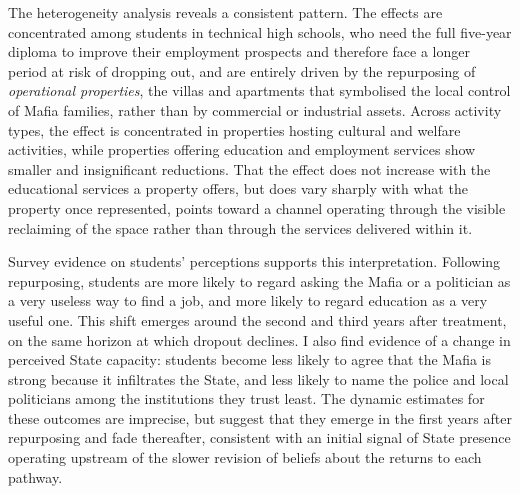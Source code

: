 \documentclass[12pt]{article}
\theoremstyle{plain}
\theoremstyle{plain}
\theoremstyle{plain}
\theoremstyle{definition}
\theoremstyle{plain}
\theoremstyle{definition}
\theoremstyle{plain}
\theoremstyle{remark}
\theoremstyle{definition}
\theoremstyle{definition}
\theoremstyle{plain}
\begin{document}
The heterogeneity analysis reveals a consistent pattern. The effects are concentrated among students in technical high schools, who need the full five-year diploma to improve their employment prospects and therefore face a longer period at risk of dropping out, and are entirely driven by the repurposing of \emph{operational properties}, the villas and apartments that symbolised the local control of Mafia families, rather than by commercial or industrial assets. Across activity types, the effect is concentrated in properties hosting cultural and welfare activities, while properties offering education and employment services show smaller and insignificant reductions. That the effect does not increase with the educational services a property offers, but does vary sharply with what the property once represented, points toward a channel operating through the visible reclaiming of the space rather than through the services delivered within it.

Survey evidence on students' perceptions supports this interpretation. Following repurposing, students are more likely to regard asking the Mafia or a politician as a very useless way to find a job, and more likely to regard education as a very useful one. This shift emerges around the second and third years after treatment, on the same horizon at which dropout declines. I also find evidence of a change in perceived State capacity: students become less likely to agree that the Mafia is strong because it infiltrates the State, and less likely to name the police and local politicians among the institutions they trust least. The dynamic estimates for these outcomes are imprecise, but suggest that they emerge in the first years after repurposing and fade thereafter, consistent with an initial signal of State presence operating upstream of the slower revision of beliefs about the returns to each pathway.
\end{document}
